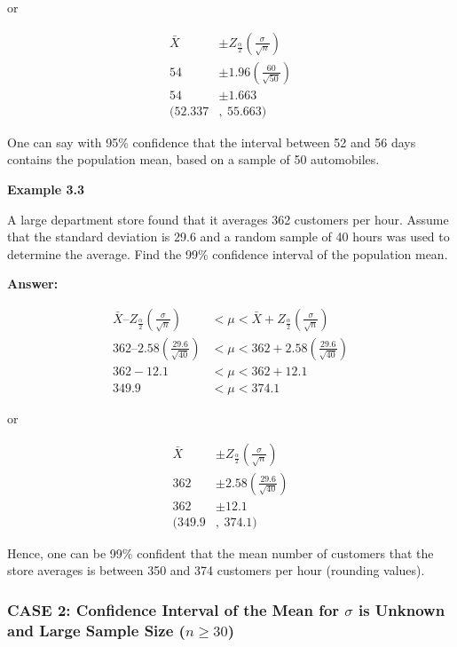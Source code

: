\documentclass[
  a4paper,
  DIV=11,
  numbers=noendperiod,
  oneside]{scrreprt}
\begin{document}
\hfill\break
\hfill\break
\hfill\break
or

\[
\begin{aligned}
\bar{X} &\pm Z_{\frac{\alpha}{2}}\left(\frac{\sigma}{\sqrt{n}}\right) \\
54 &\pm 1.96\left(\frac{60}{\sqrt{50}}\right)\\
54 &\pm 1.663 \\
(52.337&,\ 55.663)
\end{aligned}
\]

One can say with 95\% confidence that the interval between 52 and 56
days contains the population mean, based on a sample of 50 automobiles.

{\textbf{Example 3.3}}

A large department store found that it averages 362 customers per hour.
Assume that the standard deviation is 29.6 and a random sample of 40
hours was used to determine the average. Find the 99\% confidence
interval of the population mean.

{\textbf{Answer:}}

\[
\begin{aligned}
\bar{X} – Z_{\frac{\alpha}{2}}\left(\frac{\sigma}{\sqrt{n}}\right) &\lt \mu \lt \bar{X} + Z_{\frac{\alpha}{2}}\left(\frac{\sigma}{\sqrt{n}}\right) \\
362 – 2.58\left(\frac{29.6}{\sqrt{40}}\right) &\lt \mu \lt 362 + 2.58\left(\frac{29.6}{\sqrt{40}}\right) \\
362 - 12.1 &\lt \mu \lt 362 + 12.1 \\
349.9 &\lt \mu \lt 374.1
\end{aligned}
\]

\hfill\break
\hfill\break
\hfill\break
or

\[
\begin{aligned}
\bar{X} &\pm Z_{\frac{\alpha}{2}}\left(\frac{\sigma}{\sqrt{n}}\right) \\
362 &\pm 2.58\left(\frac{29.6}{\sqrt{40}}\right)\\
362 &\pm 12.1 \\
(349.9&,\ 374.1)
\end{aligned}
\]

Hence, one can be 99\% confident that the mean number of customers that
the store averages is between 350 and 374 customers per hour (rounding
values).

\hypertarget{case-2-confidence-interval-of-the-mean-for-sigma-is-unknown-and-large-sample-size-n-ge-30}{%
\subsubsection{\texorpdfstring{\textbf{CASE 2: Confidence Interval of
the Mean for \(\sigma\) is Unknown and Large Sample Size
(\(n \ge 30\))}}{CASE 2: Confidence Interval of the Mean for \textbackslash sigma is Unknown and Large Sample Size (n \textbackslash ge 30)}}\label{case-2-confidence-interval-of-the-mean-for-sigma-is-unknown-and-large-sample-size-n-ge-30}}
\end{document}
